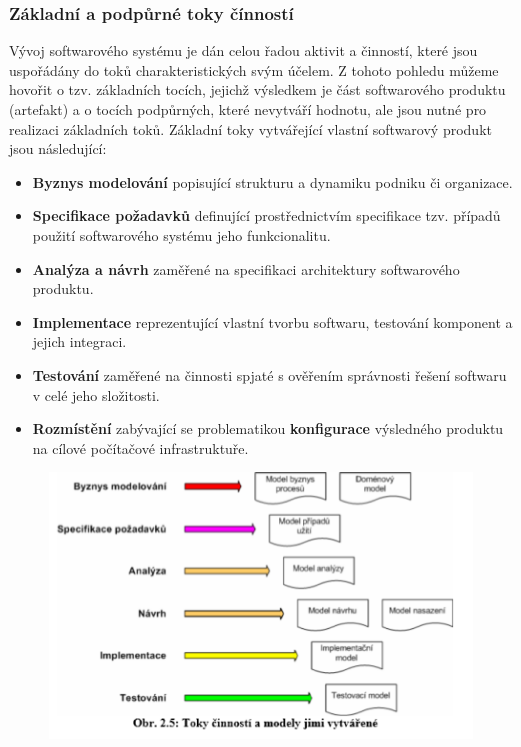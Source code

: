 \subsubsection{Základní a podpůrné toky čínností}
Vývoj softwarového systému je dán celou řadou aktivit a činností, které jsou uspořádány do toků charakteristických svým účelem.  Z tohoto pohledu můžeme hovořit o tzv. základních tocích, jejichž výsledkem je část softwarového produktu (artefakt) a o tocích podpůrných, které nevytváří hodnotu, ale jsou nutné pro realizaci základních toků. 
Základní toky vytvářející vlastní softwarový produkt jsou následující: 
\begin{itemize}
\item \textbf{Byznys modelování} popisující strukturu a dynamiku podniku či organizace.
\item \textbf{Specifikace požadavků} definující prostřednictvím specifikace tzv. případů použití softwarového systému jeho funkcionalitu.
\item \textbf{Analýza a návrh} zaměřené na specifikaci architektury softwarového produktu.
\item \textbf{Implementace} reprezentující vlastní tvorbu softwaru, testování komponent a jejich integraci.
\item \textbf{Testování} zaměřené na činnosti spjaté s ověřením správnosti řešení softwaru v celé jeho složitosti.
\item \textbf{Rozmístění} zabývající se problematikou \textbf{konfigurace} výsledného produktu na cílové počítačové infrastruktuře. 
\end{itemize}

\begin{figure}[H]
	\centering
	\includegraphics[width=1\textwidth]{assets/toky_cinnosti.png}
\end{figure}

